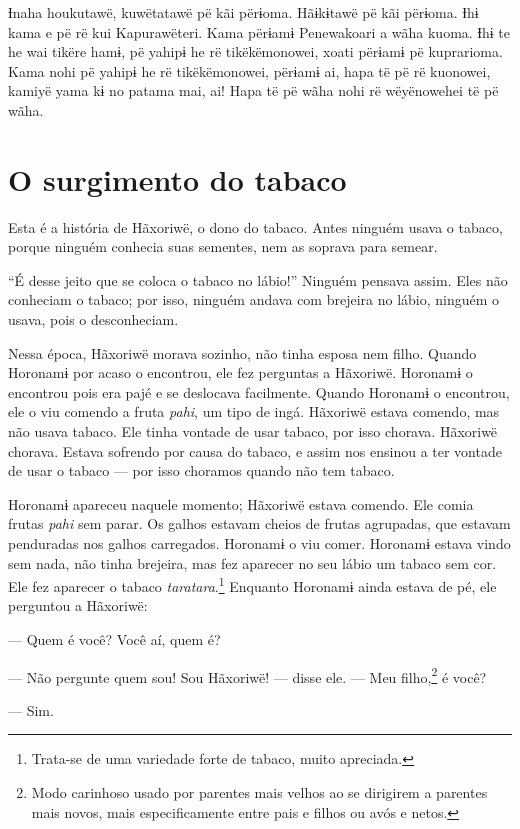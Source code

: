 Ɨnaha houkutawë, kuwëtatawë pë kãi përɨoma. Hãɨkɨtawë pë kãi përɨoma.
Ɨhɨ kama e pë rë kui Kapurawëteri. Kama përɨamɨ Penewakoari a wãha
kuoma. Ɨhɨ te he wai tikëre hamɨ, pë yahipɨ he rë tikëkëmonowei, xoati
përɨamɨ pë kuprarioma. Kama nohi pë yahipɨ he rë tikëkëmonowei, përɨamɨ
ai, hapa të pë rë kuonowei, kamiyë yama kɨ no patama mai, ai! Hapa të pë
wãha nohi rë wëyënowehei të pë wãha.
 
\chapter{O surgimento do tabaco}
 
Esta é a história de Hãxoriwë, o dono do tabaco. Antes ninguém usava o
tabaco, porque ninguém conhecia suas sementes, nem as soprava para
semear. 

``É desse jeito que se coloca o tabaco no lábio!'' Ninguém pensava
assim. Eles não conheciam o tabaco; por isso, ninguém andava com
brejeira no lábio, ninguém o usava, pois o desconheciam. 

Nessa época, Hãxoriwë morava sozinho, não tinha esposa nem
filho. Quando Horonamɨ por acaso o encontrou, ele fez
perguntas a Hãxoriwë. Horonamɨ o encontrou pois era pajé e se deslocava
facilmente. Quando Horonamɨ o encontrou, ele o viu comendo a
fruta \textit{pahi}, um tipo de ingá. Hãxoriwë estava comendo, mas não
usava tabaco. Ele tinha vontade de usar tabaco, por isso chorava.
Hãxoriwë chorava. Estava sofrendo por causa do tabaco, e assim nos
ensinou a ter vontade de usar o tabaco --- por isso choramos quando não
tem tabaco. 

Horonamɨ apareceu naquele momento; Hãxoriwë estava comendo. Ele comia
frutas \textit{pahi} sem parar. Os galhos estavam cheios de frutas
agrupadas, que estavam penduradas nos galhos carregados. Horonamɨ o viu
comer. Horonamɨ estava vindo sem nada, não tinha brejeira, mas fez
aparecer no seu lábio um tabaco sem cor. Ele fez aparecer o
tabaco \textit{taratara}.\footnote{Trata-se de uma variedade forte de tabaco, muito apreciada.}  Enquanto Horonamɨ ainda estava
de pé, ele perguntou a Hãxoriwë: 

--- Quem é você? Você aí, quem é? 

--- Não pergunte quem sou! Sou Hãxoriwë! --- disse ele. --- Meu
filho,\footnote{Modo carinhoso usado por parentes mais velhos ao se dirigirem a
parentes mais novos, mais especificamente entre pais e filhos ou avós e
netos.} é você? 

--- Sim.

